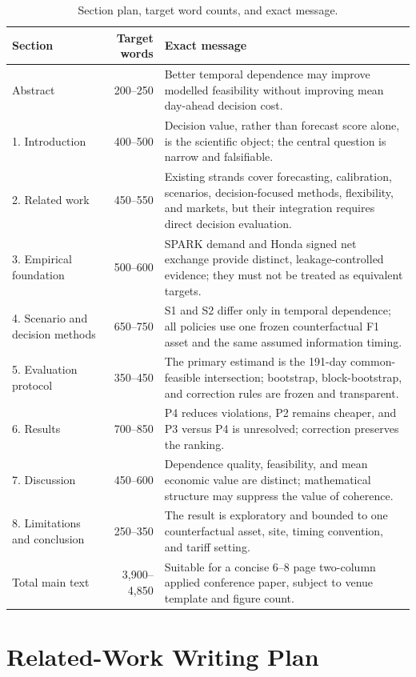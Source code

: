 \documentclass[10pt,twocolumn]{article}
\begin{document}
\begin{table}[h]
\centering
\caption{Section plan, target word counts, and exact message.}
\label{tab:outline}
\small
\begin{tabularx}{\textwidth}{p{}rX}
\toprule
Section & Target words & Exact message\\
\midrule
Abstract & 200--250 & Better temporal dependence may improve modelled feasibility without improving mean day-ahead decision cost.\\
1. Introduction & 400--500 & Decision value, rather than forecast score alone, is the scientific object; the central question is narrow and falsifiable.\\
2. Related work & 450--550 & Existing strands cover forecasting, calibration, scenarios, decision-focused methods, flexibility, and markets, but their integration requires direct decision evaluation.\\
3. Empirical foundation & 500--600 & SPARK demand and Honda signed net exchange provide distinct, leakage-controlled evidence; they must not be treated as equivalent targets.\\
4. Scenario and decision methods & 650--750 & S1 and S2 differ only in temporal dependence; all policies use one frozen counterfactual F1 asset and the same assumed information timing.\\
5. Evaluation protocol & 350--450 & The primary estimand is the 191-day common-feasible intersection; bootstrap, block-bootstrap, and correction rules are frozen and transparent.\\
6. Results & 700--850 & P4 reduces violations, P2 remains cheaper, and P3 versus P4 is unresolved; correction preserves the ranking.\\
7. Discussion & 450--600 & Dependence quality, feasibility, and mean economic value are distinct; mathematical structure may suppress the value of coherence.\\
8. Limitations and conclusion & 250--350 & The result is exploratory and bounded to one counterfactual asset, site, timing convention, and tariff setting.\\
\midrule
Total main text & 3,900--4,850 & Suitable for a concise 6--8 page two-column applied conference paper, subject to venue template and figure count.\\
\bottomrule
\end{tabularx}
\end{table}

\section{Related-Work Writing Plan}
\label{app:related}
\end{document}
